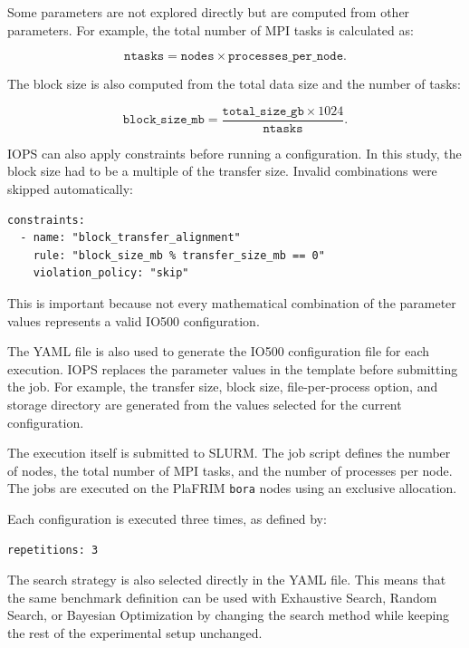 Some parameters are not explored directly but are computed from other
parameters. For example, the total number of MPI tasks is calculated as:

\[
\texttt{ntasks} =
\texttt{nodes} \times \texttt{processes\_per\_node}.
\]

The block size is also computed from the total data size and the number
of tasks:

\[
\texttt{block\_size\_mb} =
\frac{\texttt{total\_size\_gb} \times 1024}
{\texttt{ntasks}}.
\]

IOPS can also apply constraints before running a configuration. In this
study, the block size had to be a multiple of the transfer size. Invalid
combinations were skipped automatically:

\begin{verbatim}
constraints:
  - name: "block_transfer_alignment"
    rule: "block_size_mb % transfer_size_mb == 0"
    violation_policy: "skip"
\end{verbatim}

This is important because not every mathematical combination of the
parameter values represents a valid IO500 configuration.

The YAML file is also used to generate the IO500 configuration file for
each execution. IOPS replaces the parameter values in the template before
submitting the job. For example, the transfer size, block size,
file-per-process option, and storage directory are generated from the
values selected for the current configuration.

The execution itself is submitted to SLURM. The job script defines the
number of nodes, the total number of MPI tasks, and the number of
processes per node. The jobs are executed on the PlaFRIM
\texttt{bora} nodes using an exclusive allocation.

Each configuration is executed three times, as defined by:

\begin{verbatim}
repetitions: 3
\end{verbatim}

The search strategy is also selected directly in the YAML file. This
means that the same benchmark definition can be used with Exhaustive
Search, Random Search, or Bayesian Optimization by changing the search
method while keeping the rest of the experimental setup unchanged.

